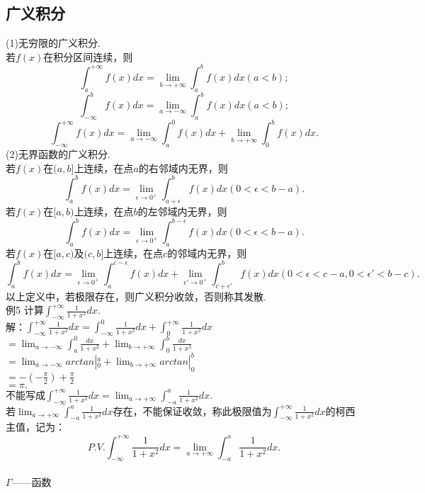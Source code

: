\documentclass[UTF8]{ctexart}
\begin{document}
\vspace{-4mm} \subsection{广义积分}  \vspace{-2mm} \small (1)无穷限的广义积分.
\\若$f(x)$在积分区间连续，则
$$\displaystyle{\int_a^{+\infty}f(x)dx=\lim_{b \to +\infty} \int_a^b f(x)dx(a<b);}$$
$$\displaystyle{\int_{-\infty}^b f(x)dx=\lim_{a \to -\infty} \int_a^b f(x)dx(a<b);}$$
$$\displaystyle{\int_{-\infty}^{+\infty}f(x)dx=\lim_{a \to -\infty} \int _a^0 f(x)dx+\lim_{b \to +\infty} \int _0^b f(x)dx}.$$
(2)无界函数的广义积分.
\\若$f(x)$在$(a,b]$上连续，在点$a$的右邻域内无界，则
$$\displaystyle{\int_a^b f(x)dx=\lim_{\epsilon \to 0^+}\int_{a+\epsilon}^b f(x)dx(0<\epsilon<b-a)}.$$
若$f(x)$在$[a,b)$上连续，在点$b$的左邻域内无界，则
$$\displaystyle{\int_a^b f(x)dx=\lim_{\epsilon \to 0^+}\int_{a}^{b-\epsilon} f(x)dx(0<\epsilon<b-a)}.$$
若$f(x)$在$[a,c)$及$(c,b]$上连续，在点$c$的邻域内无界，则
$$\displaystyle{\int_a^b f(x)dx=\lim_{\epsilon \to 0^+}\int_{a}^{c-\epsilon} f(x)dx+\lim_{\epsilon' \to 0^+}\int_{c+\epsilon'}^b f(x)dx(0<\epsilon<c-a,0<\epsilon'<b-c)}.$$
以上定义中，若极限存在，则广义积分收敛，否则称其发散.
\\例5 计算$\displaystyle{\int_{-\infty}^{+\infty} \frac{1}{1+x^2}dx.}$
\\解：$\displaystyle{\int_{-\infty}^{+\infty} \frac{1}{1+x^2}dx=\int_{-\infty}^0 \frac{1}{1+x^2}dx+\int_0^{+\infty} \frac{1}{1+x^2}dx}$
\\$=\displaystyle{\lim_{a \to -\infty}\int_a^0 \frac{dx}{1+x^2}+\lim_{b \to +\infty}\int_0^b \frac{dx}{1+x^2}}$
\\$=\displaystyle{\lim_{a \to -\infty} arctan|_0^a+\lim_{b \to +\infty} arctan|_0^b}$
\\$=\displaystyle{-(-\frac{\pi}{2})+\frac{\pi}{2}}$
\\$=\pi.$
\\不能写成$\displaystyle{\int_{-\infty}^{+\infty} \frac{1}{1+x^2}dx=\lim_{a \to +\infty} \int_{-a}^a \frac{1}{1+x^2}dx}.$
\\若$\displaystyle{\lim_{a \to +\infty} \int_{-a}^a \frac{1}{1+x^2}dx}$存在，不能保证收敛，称此极限值为$\displaystyle{\int_{-\infty}^{+\infty} \frac{1}{1+x^2}dx}$的柯西主值，记为：
$$P.V.\displaystyle{\int_{-\infty}^{+\infty} \frac{1}{1+x^2}dx=\lim_{a \to +\infty} \int_{-a}^a \frac{1}{1+x^2}dx}.$$
\\$\varGamma$——函数
\end{document}
